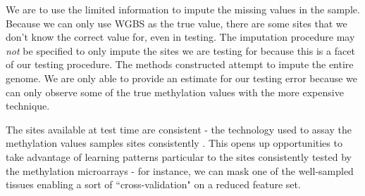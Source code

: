 \documentclass{article} %
\begin{document}
We are to use the limited information to impute the missing values in the sample. Because we can only use WGBS as the true value, there are some sites that we don't know the correct value for, even in testing. The imputation procedure may {\em not} be specified to only impute the sites we are testing for because this is a facet of our testing procedure. The methods constructed attempt to impute the entire genome. We are only able to provide an estimate for our testing error because we can only observe some of the true methylation values with the more expensive technique.

The sites available at test time are consistent - the technology used to assay the methylation values samples sites consistently \cite{infinium}. This opens up opportunities to take advantage of learning patterns particular to the sites consistently tested by the methylation microarrays - for instance, we can mask one of the well-sampled tissues enabling a sort of ``cross-validation" on a reduced feature set.
\end{document}
